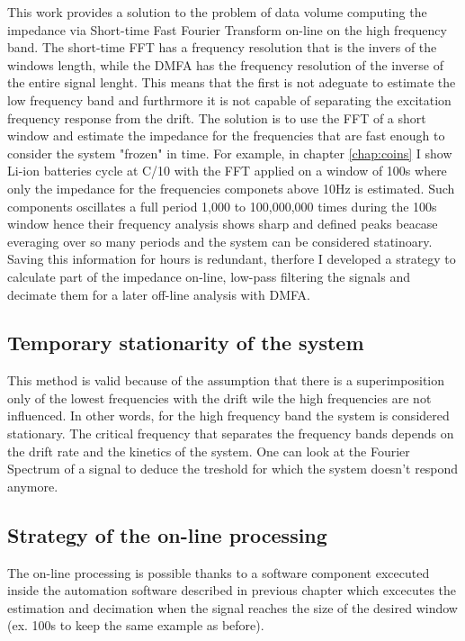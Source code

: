 This work provides a solution to the problem of data volume computing the impedance via Short-time Fast Fourier Transform on-line on the high frequency band. 
The short-time FFT has a frequency resolution that is the invers of the windows length, while the DMFA has the frequency resolution of the inverse of the entire signal lenght. 
This means that the first is not adeguate to estimate the low frequency band and furthrmore it is not capable of separating the excitation frequency response from the drift.
The solution is to use the FFT of a short window and estimate the impedance for the frequencies that are fast enough to consider the system "frozen" in time. 
For example, in chapter \ref{chap:coins} I show Li-ion batteries cycle at C/10 with the FFT applied on a window of 100s where only the impedance for the frequencies componets above 10Hz is estimated.
Such components oscillates a full period 1,000 to 100,000,000 times during the 100s window hence their frequency analysis shows sharp and defined peaks beacase everaging over so many periods and the system can be considered statinoary.
Saving this information for hours is redundant, therfore I developed a strategy to calculate part of the impedance on-line, low-pass filtering the signals and decimate them for a later off-line analysis with DMFA.

\subsection{Temporary stationarity of the system}
This method is valid because of the assumption that there is a superimposition only of the lowest frequencies with the drift wile the high frequencies are not influenced.
In other words, for the high frequency band the system is considered stationary. 
The critical frequency that separates the frequency bands depends on the drift rate and the kinetics of the system.
One can look at the Fourier Spectrum of a signal to deduce the treshold for which the system doesn't respond anymore.

\subsection{Strategy of the on-line processing}

The on-line processing is possible thanks to a software component excecuted inside the automation software described in previous chapter which excecutes the estimation and decimation when the signal reaches the size of the desired window (ex. 100s to keep the same example as before).

